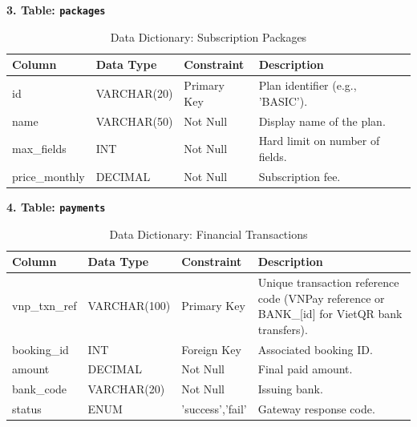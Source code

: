 \textbf{3. Table: \texttt{packages}}
\begin{table}[htbp]
\centering
\begin{tabularx}{\textwidth}{|l|l|l|X|}
\hline
\rowcolor{LightCyan}
\textbf{Column} & \textbf{Data Type} & \textbf{Constraint} & \textbf{Description} \\ \hline
id & VARCHAR(20) & Primary Key & Plan identifier (e.g., 'BASIC'). \\ \hline
name & VARCHAR(50) & Not Null & Display name of the plan. \\ \hline
max\_fields & INT & Not Null & Hard limit on number of fields. \\ \hline
price\_monthly & DECIMAL & Not Null & Subscription fee. \\ \hline
\end{tabularx}
\caption{Data Dictionary: Subscription Packages}
\end{table}

\textbf{4. Table: \texttt{payments}}
\begin{table}[htbp]
\centering
\begin{tabularx}{\textwidth}{|l|l|l|X|}
\hline
\rowcolor{LightCyan}
\textbf{Column} & \textbf{Data Type} & \textbf{Constraint} & \textbf{Description} \\ \hline
vnp\_txn\_ref & VARCHAR(100) & Primary Key & Unique transaction reference code (VNPay reference or BANK\_[id] for VietQR bank transfers). \\ \hline
booking\_id & INT & Foreign Key & Associated booking ID. \\ \hline
amount & DECIMAL & Not Null & Final paid amount. \\ \hline
bank\_code & VARCHAR(20) & Not Null & Issuing bank. \\ \hline
status & ENUM & 'success','fail' & Gateway response code. \\ \hline
\end{tabularx}
\caption{Data Dictionary: Financial Transactions}
\end{table}

